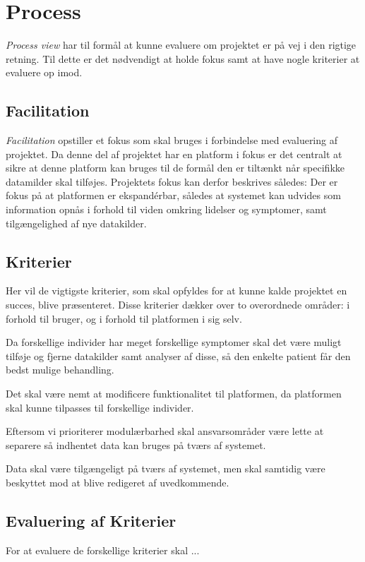\section{Process}\label{sec:process}
\emph{Process view} har til formål at kunne evaluere om projektet er på vej i den rigtige retning. 
Til dette er det nødvendigt at holde fokus samt at have nogle kriterier at evaluere op imod.

\subsection{Facilitation}
\emph{Facilitation} opstiller et fokus som skal bruges i forbindelse med evaluering af projektet.
Da denne del af projektet har en platform i fokus er det centralt at sikre at denne platform kan bruges til de formål den er tiltænkt når specifikke datamilder skal tilføjes.
Projektets fokus kan derfor beskrives således:
Der er fokus på at platformen er ekspandérbar, således at systemet kan udvides som information opnås i forhold til viden omkring lidelser og symptomer, samt tilgængelighed af nye datakilder.

\subsection{Kriterier}\label{firstsubseckriterier}
Her vil de vigtigste kriterier, som skal opfyldes for at kunne kalde projektet en succes, blive præsenteret.
Disse kriterier dækker over to overordnede områder: i forhold til bruger, og i forhold til platformen i sig selv.

\begin{description}[style=nextline]
	\item[Modulær] 
	Da forskellige individer har meget forskellige symptomer skal det være muligt tilføje og fjerne datakilder samt analyser af disse, så den enkelte patient får den bedst mulige behandling.
	\item[Fleksibilitet]
	Det skal være nemt at modificere funktionalitet til platformen, da platformen skal kunne tilpasses til forskellige individer.
	\item[Kombinerbar] Eftersom vi prioriterer modulærbarhed skal ansvarsområder være lette at separere så indhentet data kan bruges på tværs af systemet.
	\item[Kommunikation] Data skal være tilgængeligt på tværs af systemet, men skal samtidig være beskyttet mod at blive redigeret af uvedkommende.
\end{description}

\subsection{Evaluering af Kriterier}
For at evaluere de forskellige kriterier skal ...


